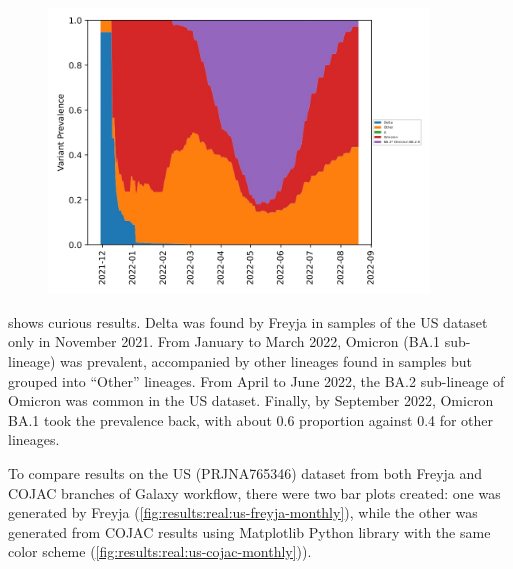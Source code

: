     \begin{figure}[ht!]
        \centering
        \includegraphics[width=0.9\textwidth]{figures/results/real/us-freyja-daily.jpg}
        \label{fig:results:real:us-freyja-daily}
    \end{figure}
    
     shows curious results. Delta was found by Freyja in samples of the US dataset only in November 2021. From January to March 2022, Omicron (BA.1 sub-lineage) was prevalent, accompanied by other lineages found in samples but grouped into “Other” lineages. From April to June 2022, the BA.2 sub-lineage of Omicron was common in the US dataset. Finally, by September 2022, Omicron BA.1 took the prevalence back, with about 0.6 proportion against 0.4 for other lineages.

    To compare results on the US (PRJNA765346) dataset from both Freyja and COJAC branches of Galaxy workflow, there were two bar plots created: one was generated by Freyja  (\cref{fig:results:real:us-freyja-monthly}), while the other was generated from COJAC results using Matplotlib Python library with the same color scheme (\cref{fig:results:real:us-cojac-monthly})).
    
